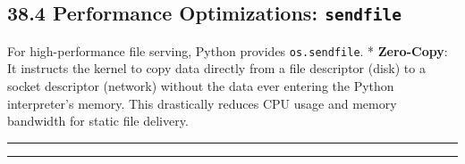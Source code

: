 \hypertarget{performance-optimizations-sendfile}{%
\subsection{\texorpdfstring{38.4 Performance Optimizations:
\texttt{sendfile}}{38.4 Performance Optimizations: sendfile}}\label{performance-optimizations-sendfile}}

For high-performance file serving, Python provides
\passthrough{\lstinline!os.sendfile!}. * \textbf{Zero-Copy}: It
instructs the kernel to copy data directly from a file descriptor (disk)
to a socket descriptor (network) without the data ever entering the
Python interpreter's memory. This drastically reduces CPU usage and
memory bandwidth for static file delivery.

\begin{center}\rule{0.5\linewidth}{0.5pt}\end{center}

\begin{center}\rule{0.5\linewidth}{0.5pt}\end{center}
